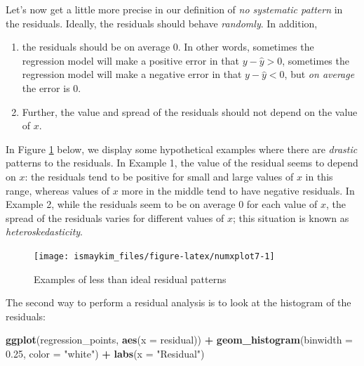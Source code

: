 \documentclass[12pt,]{krantz}
\makeatletter
\newenvironment{Shaded}{\begin{snugshade}}{\end{snugshade}}
\newcommand{\KeywordTok}[1]{\textcolor[rgb]{0.27,0.27,0.27}{\textbf{#1}}}
\newcommand{\DataTypeTok}[1]{\textcolor[rgb]{0.27,0.27,0.27}{#1}}
\newcommand{\FloatTok}[1]{\textcolor[rgb]{0.06,0.06,0.06}{#1}}
\newcommand{\StringTok}[1]{\textcolor[rgb]{0.5,0.5,0.5}{#1}}
\newcommand{\OperatorTok}[1]{\textcolor[rgb]{0.43,0.43,0.43}{\textbf{#1}}}
\newcommand{\NormalTok}[1]{#1}
\providecommand{\tightlist}{%
  \setlength{\itemsep}{0pt}\setlength{\parskip}{0pt}}
\newenvironment{kframe}{%
\medskip{}
\setlength{\fboxsep}{.8em}
 \def\at@end@of@kframe{}%
 \ifinner\ifhmode%
  \def\at@end@of@kframe{\end{minipage}}%
  \begin{minipage}{\columnwidth}%
 \fi\fi%
 \def\FrameCommand##1{\hskip\@totalleftmargin \hskip-\fboxsep
 \colorbox{shadecolor}{##1}\hskip-\fboxsep
     \hskip-\linewidth \hskip-\@totalleftmargin \hskip\columnwidth}%
 \MakeFramed {\advance\hsize-\width
   \@totalleftmargin\z@ \linewidth\hsize
   \@setminipage}}%
 {\par\unskip\endMakeFramed%
 \at@end@of@kframe}
\renewenvironment{Shaded}{\begin{kframe}}{\end{kframe}}
\theoremstyle{definition}
\theoremstyle{definition}
\theoremstyle{definition}
\theoremstyle{remark}
\makeatother
\begin{document}
Let's now get a little more precise in our definition of \emph{no
systematic pattern} in the residuals. Ideally, the residuals should
behave \emph{randomly}. In addition,

\begin{enumerate}
\def\labelenumi{\arabic{enumi}.}
\tightlist
\item
  the residuals should be on average 0. In other words, sometimes the
  regression model will make a positive error in that
  \(y - \widehat{y} > 0\), sometimes the regression model will make a
  negative error in that \(y - \widehat{y} < 0\), but \emph{on average}
  the error is 0.
\item
  Further, the value and spread of the residuals should not depend on
  the value of \(x\).
\end{enumerate}

In Figure \ref{fig:numxplot7} below, we display some hypothetical
examples where there are \emph{drastic} patterns to the residuals. In
Example 1, the value of the residual seems to depend on \(x\): the
residuals tend to be positive for small and large values of \(x\) in
this range, whereas values of \(x\) more in the middle tend to have
negative residuals. In Example 2, while the residuals seem to be on
average 0 for each value of \(x\), the spread of the residuals varies
for different values of \(x\); this situation is known as
\emph{heteroskedasticity}.

\begin{figure}

{\centering \texttt{[image: ismaykim\_files/figure-latex/numxplot7-1]} 

}

\caption{Examples of less than ideal residual patterns}\label{fig:numxplot7}
\end{figure}

The second way to perform a residual analysis is to look at the
histogram of the residuals:

\begin{Shaded}
\begin{Highlighting}[]
\KeywordTok{ggplot}\NormalTok{(regression_points, }\KeywordTok{aes}\NormalTok{(}\DataTypeTok{x =}\NormalTok{ residual)) }\OperatorTok{+}
\StringTok{  }\KeywordTok{geom_histogram}\NormalTok{(}\DataTypeTok{binwidth =} \FloatTok{0.25}\NormalTok{, }\DataTypeTok{color =} \StringTok{"white"}\NormalTok{) }\OperatorTok{+}
\StringTok{  }\KeywordTok{labs}\NormalTok{(}\DataTypeTok{x =} \StringTok{"Residual"}\NormalTok{)}
\end{Highlighting}
\end{Shaded}
\end{document}
